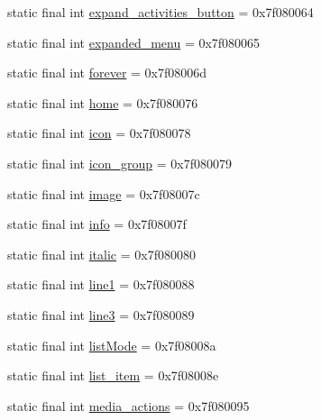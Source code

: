 \begin{DoxyCompactItemize}
\item 
static final int \mbox{\hyperlink{classandroid_1_1support_1_1v7_1_1appcompat_1_1R_1_1id_a322929fd47d9215e3b10b62d3762f5eb}{expand\+\_\+activities\+\_\+button}} = 0x7f080064
\item 
static final int \mbox{\hyperlink{classandroid_1_1support_1_1v7_1_1appcompat_1_1R_1_1id_a3aa9e89f2cfd5dd834212e9e9d185a81}{expanded\+\_\+menu}} = 0x7f080065
\item 
static final int \mbox{\hyperlink{classandroid_1_1support_1_1v7_1_1appcompat_1_1R_1_1id_ac482eacd695f4a22c19507fd2a40f696}{forever}} = 0x7f08006d
\item 
static final int \mbox{\hyperlink{classandroid_1_1support_1_1v7_1_1appcompat_1_1R_1_1id_acedb19aa69792f84b956f8fb7cc4b972}{home}} = 0x7f080076
\item 
static final int \mbox{\hyperlink{classandroid_1_1support_1_1v7_1_1appcompat_1_1R_1_1id_a4aedeaf21775058da43c7431df03fd74}{icon}} = 0x7f080078
\item 
static final int \mbox{\hyperlink{classandroid_1_1support_1_1v7_1_1appcompat_1_1R_1_1id_ae198dc56dc986e6073f5d91f1e57de9b}{icon\+\_\+group}} = 0x7f080079
\item 
static final int \mbox{\hyperlink{classandroid_1_1support_1_1v7_1_1appcompat_1_1R_1_1id_ab241f4f2c0eadbf28120bd907d5756c7}{image}} = 0x7f08007c
\item 
static final int \mbox{\hyperlink{classandroid_1_1support_1_1v7_1_1appcompat_1_1R_1_1id_a38db22f7031085d2c98980b68baa9d2c}{info}} = 0x7f08007f
\item 
static final int \mbox{\hyperlink{classandroid_1_1support_1_1v7_1_1appcompat_1_1R_1_1id_aa78c67a96c1621bd6c977ed72aad9094}{italic}} = 0x7f080080
\item 
static final int \mbox{\hyperlink{classandroid_1_1support_1_1v7_1_1appcompat_1_1R_1_1id_a89744f9f50d9da0cb8219f081a2bc47e}{line1}} = 0x7f080088
\item 
static final int \mbox{\hyperlink{classandroid_1_1support_1_1v7_1_1appcompat_1_1R_1_1id_ac494a9871238dcf6ff5a1debc911c999}{line3}} = 0x7f080089
\item 
static final int \mbox{\hyperlink{classandroid_1_1support_1_1v7_1_1appcompat_1_1R_1_1id_a523b582894e761fb50c74f46aaa26448}{list\+Mode}} = 0x7f08008a
\item 
static final int \mbox{\hyperlink{classandroid_1_1support_1_1v7_1_1appcompat_1_1R_1_1id_acbc2d1a0b0995143f0b7c4c223f75d3f}{list\+\_\+item}} = 0x7f08008e
\item 
static final int \mbox{\hyperlink{classandroid_1_1support_1_1v7_1_1appcompat_1_1R_1_1id_a9f9be1dbc8b94223233af0b5be1676d2}{media\+\_\+actions}} = 0x7f080095

\end{DoxyCompactItemize}
